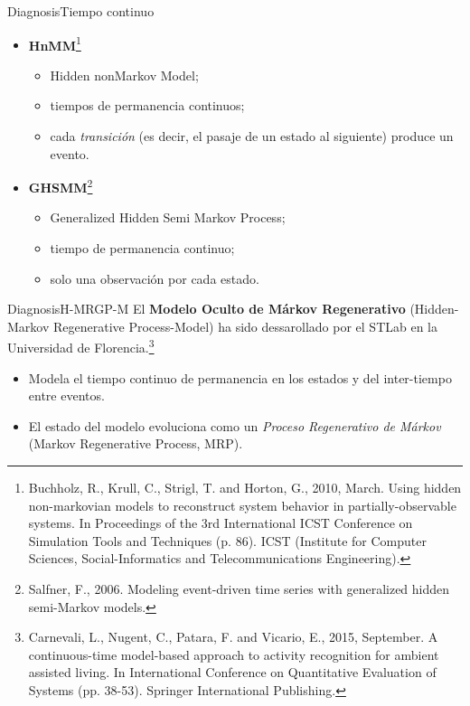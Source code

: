 \documentclass[9pt, handout]{beamer}
\begin{document}
      \begin{frame}{Diagnosis}{Tiempo continuo}
        \begin{itemize}
          \item \textbf{HnMM}\footnote{Buchholz, R., Krull, C., Strigl, T. and Horton, G., 2010, March. Using hidden non-markovian models to reconstruct system behavior in partially-observable systems. In Proceedings of the 3rd International ICST Conference on Simulation Tools and Techniques (p. 86). ICST (Institute for Computer Sciences, Social-Informatics and Telecommunications Engineering).}
          \begin{itemize}
            \item Hidden nonMarkov Model;
            \item tiempos de permanencia continuos;
            \item cada \textit{transición} (es decir, el pasaje de un estado al siguiente) produce un evento.
          \end{itemize}
          \item \textbf{GHSMM}\footnote{Salfner, F., 2006. Modeling event-driven time series with generalized hidden semi-Markov models.}
          \begin{itemize}
            \item Generalized Hidden Semi Markov Process;
            \item tiempo de permanencia continuo;
            \item solo una observación por cada estado.
          \end{itemize}
        \end{itemize}
      \end{frame}
      
      \begin{frame}{Diagnosis}{H-MRGP-M}
        El \textbf{Modelo Oculto de Márkov Regenerativo} (Hidden-Markov Regenerative Process-Model) ha sido dessarollado por el STLab en la Universidad de Florencia.\footnote{Carnevali, L., Nugent, C., Patara, F. and Vicario, E., 2015, September. A continuous-time model-based approach to activity recognition for ambient assisted living. In International Conference on Quantitative Evaluation of Systems (pp. 38-53). Springer International Publishing.}
        
        \begin{itemize}
          \item Modela el tiempo continuo de permanencia en los estados y del inter-tiempo entre eventos.
          \item El estado del modelo evoluciona como un \textit{Proceso Regenerativo de Márkov} (Markov Regenerative Process, MRP).
        \end{itemize}
      \end{frame}
      
\end{document}
